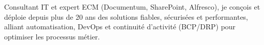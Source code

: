\par{
Consultant IT et expert ECM (Documentum, SharePoint, Alfresco), je conçois et déploie depuis plus de 20 ans des solutions fiables, sécurisées et performantes, alliant automatisation, DevOps et continuité d’activité (BCP/DRP) pour optimiser les processus métier.}
